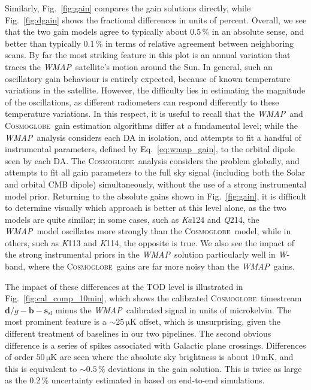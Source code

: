 \documentclass[twocolumn]{../../common/aa}
\def\WMAP{\emph{WMAP}}
\newcommand{\cosmoglobe}{\textsc{Cosmoglobe}}
\newcommand{\K}[0]{\textit K}
\newcommand{\Ka}[0]{\textit{Ka}}
\newcommand{\Q}[0]{\textit Q}
\newcommand{\W}[0]{\textit W}
\begin{document}
Similarly, Fig.~\ref{fig:gain} compares the gain solutions directly, while Fig.~\ref{fig:dgain} shows the fractional differences in units of percent. Overall, we see that the two gain models agree to typically about 0.5\,\% in an absolute sense, and better than typically 0.1\,\% in terms of relative agreement between neighboring scans. By far the most striking feature in this plot is an annual variation that traces the \WMAP\ satellite's motion around the Sun. In general, such an oscillatory gain behaviour is entirely expected, because of known temperature variations in the satellite. However, the difficulty lies in estimating the magnitude of the oscillations, as different radiometers can respond differently to these temperature variations. In this respect, it is useful to recall that the \WMAP\ and \cosmoglobe\ gain estimation algorithms differ at a fundamental level; while the \WMAP\ analysis considers each DA in isolation, and attempts to fit a handful of instrumental parameters, defined by Eq.~\eqref{eq:wmap_gain}, to the orbital dipole seen by each DA. The \cosmoglobe\ analysis considers the problem globally, and attempts to fit all gain parameters to the full sky signal (including both the Solar and orbital CMB dipole) simultaneously, without the use of a strong instrumental model prior. Returning to the absolute gains shown in Fig.~\ref{fig:gain}, it is difficult to determine visually which approach is better at this level alone, as the two models are quite similar; in some cases, such as \Ka124 and \Q214, the \WMAP\ model oscillates more strongly than the \cosmoglobe\ model, while in others, such as \K113 and \K114, the opposite is true. We also see the impact of the strong instrumental priors in the \WMAP\ solution particularly well in \W-band, where the \cosmoglobe\ gains are far more noisy than the \WMAP\ gains. 


The impact of these differences at the TOD level is illustrated in Fig.~\ref{fig:cal_comp_10min}, which shows the calibrated \cosmoglobe\ timestream $\boldsymbol d/g-\boldsymbol b-\boldsymbol s_\mathrm{sl}$ minus the \WMAP\ calibrated signal in units of microkelvin. The most prominent feature is a $\sim25\,\mathrm{\mu K}$ offset, which is unsurprising, given the different treatment of baselines in our two pipelines. The second obvious difference is a series of spikes associated with Galactic plane crossings. Differences of order $50\,\mathrm{\mu K}$ are seen where the absolute sky brightness is about $10\,\mathrm{mK}$, and this is equivalent to $\sim0.5\,\%$ deviations in the gain solution. This is twice as large as the 0.2\,\% uncertainty estimated in \citet{bennett2012} based on end-to-end simulations.
\end{document}
